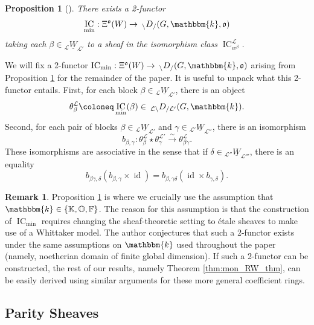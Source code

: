 \documentclass{amsart}
\newcommand{\F}{\mathbb{F}}
\renewcommand{\O}{\mathbb{O}}
\newcommand{\K}{\mathbb{K}}
\renewcommand{\k}{\mathbbm{k}}
\newcommand{\scrL}{\mathcal{L}}
\DeclareMathOperator{\IC}{IC}
\DeclareMathOperator{\id}{id}
\newcommand{\fr}[1]{\mathfrak{#1}}
\newcommand{\DEE}[2]{\:_{#1 \backslash} D_{/ #2} }
\newcommand{\uW}[2]{{}_{#1}\underline{W}_{#2}}
\newtheorem{proposition}[subsubsection]{Proposition}
\theoremstyle{definition}
\newtheorem{remark}[subsubsection]{Remark}
\numberwithin{equation}{subsection}
\begin{document}
\begin{proposition}[{\cite[Corollary 5.8.11]{Sandvik}}]\label{prop:min_IC_functor}
  There exists a 2-functor 
  \[\IC_{\min} : \Xi^{\fr{o}} (W) \to \DEE{}{} (G, \k, \fr{o})\]
   taking each $\beta \in \uW{\scrL}{\scrL'}$ to a sheaf in the isomorphism class $\IC_{w^{\beta}}^{\scrL}$.
\end{proposition}

We will fix a 2-functor $\IC_{\min} : \Xi^{\fr{o}} (W) \to \DEE{}{} (G, \k, \fr{o})$ arising from Proposition \ref{prop:min_IC_functor} for the remainder of the paper. 
It is useful to unpack what this 2-functor entails.
First, for each block $\beta \in \uW{\scrL}{\scrL'}$, there is an object
\[\theta_{\beta}^{\scrL} \coloneq \IC_{\min} (\beta) \in \DEE{\scrL}{\scrL'} (G, \k).\]
Second, for each pair of blocks $\beta \in \uW{\scrL}{\scrL'}$ and $\gamma \in \uW{\scrL'}{\scrL''}$, there is an isomorphism
\[b_{\beta, \gamma} : \theta_{\beta}^{\scrL} \star \theta_{\gamma}^{\scrL'} \stackrel{\sim}{\to} \theta_{\beta \gamma}^{\scrL}.\]
These isomorphisms are associative in the sense that if $\delta \in \uW{\scrL''}{\scrL'''}$, there is an equality
\[b_{\beta \gamma, \delta} (b_{\beta, \gamma} \times \id) = b_{\beta, \gamma \delta} (\id \times b_{\gamma, \delta}).\]

\begin{remark}
  Proposition \ref{prop:min_IC_functor} is where we crucially use the assumption that $\k \in \{\K, \O, \F\}$.
  The reason for this assumption is that the construction of $\IC_{\min}$ requires changing the sheaf-theoretic setting to étale sheaves to make use of a Whittaker model.
  The author conjectures that such a 2-functor exists under the same assumptions on $\k$ used throughout the paper (namely, noetherian domain of finite global dimension).
  If such a 2-functor can be constructed, the rest of our results, namely Theorem \ref{thm:mon_RW_thm}, can be easily derived using similar arguments for these more general coefficient rings. 
\end{remark}

\subsection{Parity Sheaves}\label{subsec:ew_par}
\end{document}
